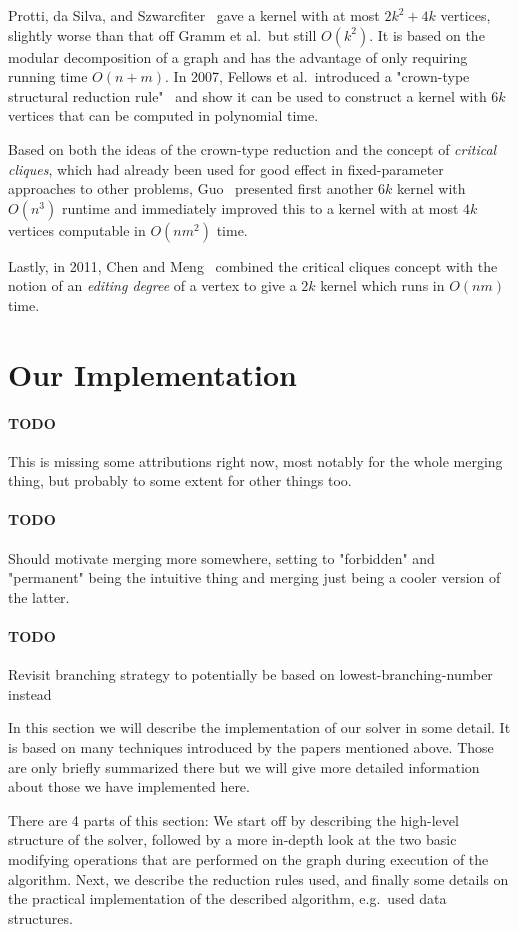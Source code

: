 \documentclass{article}
\newcommand{\todo}[1]{\paragraph{TODO} #1}
\theoremstyle{definition}
\begin{document}
Protti, da Silva, and Szwarcfiter~\cite{Protti} gave a kernel with at most $2k^2 + 4k$
vertices, slightly worse than that off Gramm et al.\ but still $O(k^2)$. It is based on the modular
decomposition of a graph and has the advantage of only requiring running time $O(n + m)$. In 2007,
Fellows et al.\ introduced a "crown-type structural reduction rule"~\cite{Fellows} and show it
can be used to construct a kernel with $6k$ vertices that can be computed in polynomial time.

Based on both the ideas of the crown-type reduction and the concept of \emph{critical cliques},
which had already been used for good effect in fixed-parameter approaches to other problems,
Guo~\cite{Guo} presented first another $6k$ kernel with $O(n^3)$ runtime and immediately improved
this to a kernel with at most $4k$ vertices computable in $O(nm^2)$ time.

Lastly, in 2011, Chen and Meng~\cite{ChenMeng} combined the critical cliques concept with the notion
of an \emph{editing degree} of a vertex to give a $2k$ kernel which runs in $O(nm)$ time.

\section{Our Implementation}

\todo This is missing some attributions right now, most notably for the whole merging thing, but
probably to some extent for other things too.

\todo Should motivate merging more somewhere, setting to "forbidden" and "permanent" being the
intuitive thing and merging just being a cooler version of the latter.

\todo Revisit branching strategy to potentially be based on lowest-branching-number instead

In this section we will describe the implementation of our solver in some detail. It is based on
many techniques introduced by the papers mentioned above. Those are only briefly summarized there
but we will give more detailed information about those we have implemented here.

There are 4 parts of this section: We start off by describing the high-level structure of the
solver, followed by a more in-depth look at the two basic modifying operations that are performed on
the graph during execution of the algorithm. Next, we describe the reduction rules used, and finally
some details on the practical implementation of the described algorithm, e.g.\ used data structures.
\end{document}
